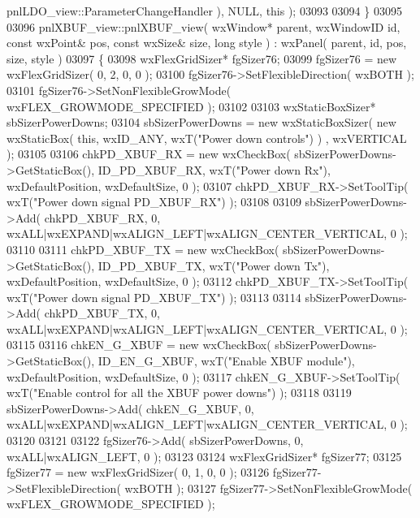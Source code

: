 \begin{DoxyCode}
      pnlLDO_view::ParameterChangeHandler ), NULL, \textcolor{keyword}{this} );
03093     
03094 \}
03095 
03096 pnlXBUF_view::pnlXBUF_view( wxWindow* parent, wxWindowID \textcolor{keywordtype}{id}, \textcolor{keyword}{const} wxPoint& pos, \textcolor{keyword}{const} wxSize& 
      size, \textcolor{keywordtype}{long} style ) : wxPanel( parent, id, pos, size, style )
03097 \{
03098     wxFlexGridSizer* fgSizer76;
03099     fgSizer76 = \textcolor{keyword}{new} wxFlexGridSizer( 0, 2, 0, 0 );
03100     fgSizer76->SetFlexibleDirection( wxBOTH );
03101     fgSizer76->SetNonFlexibleGrowMode( wxFLEX\_GROWMODE\_SPECIFIED );
03102     
03103     wxStaticBoxSizer* sbSizerPowerDowns;
03104     sbSizerPowerDowns = \textcolor{keyword}{new} wxStaticBoxSizer( \textcolor{keyword}{new} wxStaticBox( \textcolor{keyword}{this}, wxID\_ANY, wxT(\textcolor{stringliteral}{"Power down controls"}) )
      , wxVERTICAL );
03105     
03106     chkPD_XBUF_RX = \textcolor{keyword}{new} wxCheckBox( sbSizerPowerDowns->GetStaticBox(), 
      ID_PD_XBUF_RX, wxT(\textcolor{stringliteral}{"Power down Rx"}), wxDefaultPosition, wxDefaultSize, 0 );
03107     chkPD_XBUF_RX->SetToolTip( wxT(\textcolor{stringliteral}{"Power down signal PD\_XBUF\_RX"}) );
03108     
03109     sbSizerPowerDowns->Add( chkPD_XBUF_RX, 0, wxALL|wxEXPAND|wxALIGN\_LEFT|wxALIGN\_CENTER\_VERTICAL, 0 );
03110     
03111     chkPD_XBUF_TX = \textcolor{keyword}{new} wxCheckBox( sbSizerPowerDowns->GetStaticBox(), 
      ID_PD_XBUF_TX, wxT(\textcolor{stringliteral}{"Power down Tx"}), wxDefaultPosition, wxDefaultSize, 0 );
03112     chkPD_XBUF_TX->SetToolTip( wxT(\textcolor{stringliteral}{"Power down signal PD\_XBUF\_TX"}) );
03113     
03114     sbSizerPowerDowns->Add( chkPD_XBUF_TX, 0, wxALL|wxEXPAND|wxALIGN\_LEFT|wxALIGN\_CENTER\_VERTICAL, 0 );
03115     
03116     chkEN_G_XBUF = \textcolor{keyword}{new} wxCheckBox( sbSizerPowerDowns->GetStaticBox(), 
      ID_EN_G_XBUF, wxT(\textcolor{stringliteral}{"Enable XBUF module"}), wxDefaultPosition, wxDefaultSize, 0 );
03117     chkEN_G_XBUF->SetToolTip( wxT(\textcolor{stringliteral}{"Enable control for all the XBUF power downs"}) );
03118     
03119     sbSizerPowerDowns->Add( chkEN_G_XBUF, 0, wxALL|wxEXPAND|wxALIGN\_LEFT|wxALIGN\_CENTER\_VERTICAL, 0 );
03120     
03121     
03122     fgSizer76->Add( sbSizerPowerDowns, 0, wxALL|wxALIGN\_LEFT, 0 );
03123     
03124     wxFlexGridSizer* fgSizer77;
03125     fgSizer77 = \textcolor{keyword}{new} wxFlexGridSizer( 0, 1, 0, 0 );
03126     fgSizer77->SetFlexibleDirection( wxBOTH );
03127     fgSizer77->SetNonFlexibleGrowMode( wxFLEX\_GROWMODE\_SPECIFIED );

\end{DoxyCode}
